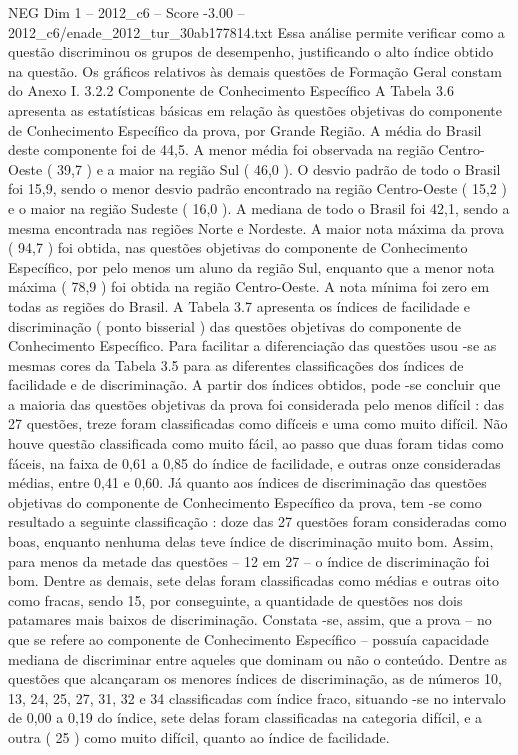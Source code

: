 \begin{textsample}{NEG Dim 1 – 2012\_c6 – Score -3.00 – 2012\_c6/enade\_2012\_tur\_30ab177814.txt}
Essa análise permite verificar como a questão discriminou os grupos de desempenho, justificando o alto índice obtido na questão.
Os gráficos relativos às demais questões de Formação Geral constam do Anexo I. 3.2.2 Componente de Conhecimento Específico A Tabela 3.6 apresenta as estatísticas básicas em relação às questões objetivas do componente de Conhecimento Específico da prova, por Grande Região.
A média do Brasil deste componente foi de 44,5.
A menor média foi observada na região Centro-Oeste ( 39,7 ) e a maior na região Sul ( 46,0 ).
O desvio padrão de todo o Brasil foi 15,9, sendo o menor desvio padrão encontrado na região Centro-Oeste ( 15,2 ) e o maior na região Sudeste ( 16,0 ).
A mediana de todo o Brasil foi 42,1, sendo a mesma encontrada nas regiões Norte e Nordeste.
A maior nota máxima da prova ( 94,7 ) foi obtida, nas questões objetivas do componente de Conhecimento Específico, por pelo menos um aluno da região Sul, enquanto que a menor nota máxima ( 78,9 ) foi obtida na região Centro-Oeste.
A nota mínima foi zero em todas as regiões do Brasil.
A Tabela 3.7 apresenta os índices de facilidade e discriminação ( ponto bisserial ) das questões objetivas do componente de Conhecimento Específico.
Para facilitar a diferenciação das questões usou -se as mesmas cores da Tabela 3.5 para as diferentes classificações dos índices de facilidade e de discriminação.
A partir dos índices obtidos, pode -se concluir que a maioria das questões objetivas da prova foi considerada pelo menos difícil : das 27 questões, treze foram classificadas como difíceis e uma como muito difícil.
Não houve questão classificada como muito fácil, ao passo que duas foram tidas como fáceis, na faixa de 0,61 a 0,85 do índice de facilidade, e outras onze consideradas médias, entre 0,41 e 0,60.
Já quanto aos índices de discriminação das questões objetivas do componente de Conhecimento Específico da prova, tem -se como resultado a seguinte classificação : doze das 27 questões foram consideradas como boas, enquanto nenhuma delas teve índice de discriminação muito bom.
Assim, para menos da metade das questões – 12 em 27 – o índice de discriminação foi bom.
Dentre as demais, sete delas foram classificadas como médias e outras oito como fracas, sendo 15, por conseguinte, a quantidade de questões nos dois patamares mais baixos de discriminação.
Constata -se, assim, que a prova – no que se refere ao componente de Conhecimento Específico – possuía capacidade mediana de discriminar entre aqueles que dominam ou não o conteúdo.
Dentre as questões que alcançaram os menores índices de discriminação, as de números 10, 13, 24, 25, 27, 31, 32 e 34 classificadas com índice fraco, situando -se no intervalo de 0,00 a 0,19 do índice, sete delas foram classificadas na categoria difícil, e a outra ( 25 ) como muito difícil, quanto ao índice de facilidade.

\end{textsample}
